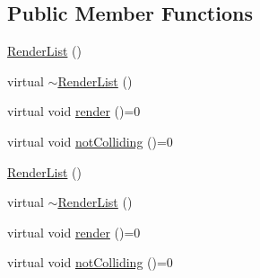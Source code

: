 \subsection*{Public Member Functions}
\begin{DoxyCompactItemize}
\item 
\hyperlink{class_robot_model_1_1_render_list_a98651fa6cd408cce14d6d245cd95fde4}{RenderList} ()
\item 
virtual \hyperlink{class_robot_model_1_1_render_list_ae66a9f72d814771e42d7e50946053ef7}{$\sim$RenderList} ()
\item 
virtual void \hyperlink{class_robot_model_1_1_render_list_ac8646765beee22bf11582049dc3cf195}{render} ()=0
\item 
virtual void \hyperlink{class_robot_model_1_1_render_list_a78436c997913ce9ad41a9bd1da9b3d96}{notColliding} ()=0
\item 
\hyperlink{class_robot_model_1_1_render_list_adf7ac2a28169e82bc8de6436aa16b521}{RenderList} ()
\item 
virtual \hyperlink{class_robot_model_1_1_render_list_aed38c9aad54e5869e4ee48e2cdf4c89b}{$\sim$RenderList} ()
\item 
virtual void \hyperlink{class_robot_model_1_1_render_list_ac8646765beee22bf11582049dc3cf195}{render} ()=0
\item 
virtual void \hyperlink{class_robot_model_1_1_render_list_a78436c997913ce9ad41a9bd1da9b3d96}{notColliding} ()=0
\end{DoxyCompactItemize}


